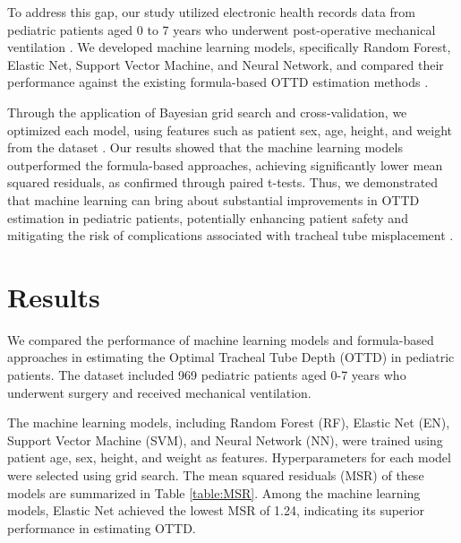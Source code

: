 \documentclass[11pt]{article}
\begin{document}
To address this gap, our study utilized electronic health records data from pediatric patients aged 0 to 7 years who underwent post-operative mechanical ventilation \cite{Zhang2019EfficacyAS, Stapleton2017RiskFF}. We developed machine learning models, specifically Random Forest, Elastic Net, Support Vector Machine, and Neural Network, and compared their performance against the existing formula-based OTTD estimation methods \cite{Wu2019HyperparameterOF}. 

Through the application of Bayesian grid search and cross-validation, we optimized each model, using features such as patient sex, age, height, and weight from the dataset \cite{Wu2019HyperparameterOF, Rauber2017FoolboxAP}. Our results showed that the machine learning models outperformed the formula-based approaches, achieving significantly lower mean squared residuals, as confirmed through paired t-tests. Thus, we demonstrated that machine learning can bring about substantial improvements in OTTD estimation in pediatric patients, potentially enhancing patient safety and mitigating the risk of complications associated with tracheal tube misplacement \cite{Kollef1994EndotrachealTM}.

\section*{Results}

We compared the performance of machine learning models and formula-based approaches in estimating the Optimal Tracheal Tube Depth (OTTD) in pediatric patients. The dataset included 969 pediatric patients aged 0-7 years who underwent surgery and received mechanical ventilation. 

The machine learning models, including Random Forest (RF), Elastic Net (EN), Support Vector Machine (SVM), and Neural Network (NN), were trained using patient age, sex, height, and weight as features. Hyperparameters for each model were selected using grid search. The mean squared residuals (MSR) of these models are summarized in Table \ref{table:MSR}. Among the machine learning models, Elastic Net achieved the lowest MSR of 1.24, indicating its superior performance in estimating OTTD.
\end{document}
